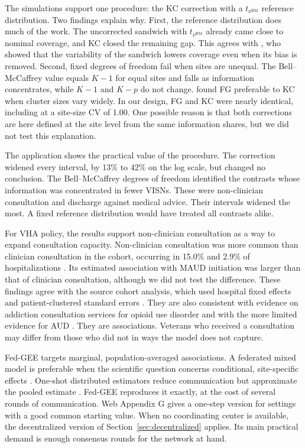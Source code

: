 \documentclass[12pt]{article}
\theoremstyle{remark}
\begin{document}
The simulations support one procedure: the KC correction with a
$t_{\nu^{\mathrm{BM}}}$ reference distribution. Two findings explain why. First,
the reference distribution does much of the work. The uncorrected sandwich with
$t_{\nu^{\mathrm{BM}}}$ already came close to nominal coverage, and KC closed the
remaining gap. This agrees with \citet{kauermann2001note}, who showed that the
variability of the sandwich lowers coverage even when its bias is removed.
Second, fixed degrees of freedom fail when sites are unequal. The
Bell--McCaffrey value equals $K-1$ for equal sites and falls as information
concentrates, while $K-1$ and $K-p$ do not change. \citet{liredden2015sandwich}
found FG preferable to KC when cluster sizes vary widely. In our design, FG and
KC were nearly identical, including at a site-size CV of 1.00. One possible
reason is that both corrections are here defined at the site level from the same
information shares, but we did not test this explanation.

The application shows the practical value of the procedure. The correction
widened every interval, by 13\% to 42\% on the log scale, but changed no
conclusion. The Bell--McCaffrey degrees of freedom identified the contrasts
whose information was concentrated in fewer VISNs. These were non-clinician
consultation and discharge against medical advice. Their intervals widened the
most. A fixed reference distribution would have treated all contrasts alike.

For VHA policy, the results support non-clinician consultation as a way to
expand consultation capacity. Non-clinician consultation was more common than
clinician consultation in the cohort, occurring in 15.0\% and 2.9\% of
hospitalizations \citep{anderson2026initiation}. Its estimated association with MAUD
initiation was larger than that of clinician consultation, although we did not
test the difference. These findings agree with the source cohort analysis, which
used hospital fixed effects and patient-clustered standard errors
\citep{anderson2026initiation}. They are also consistent with evidence on
addiction consultation services for opioid use disorder
\citep{danovitch2024addiction,ober2025hospital} and with the more limited
evidence for AUD \citep{singhtan2023addiction}. They are associations. Veterans who received a consultation may differ from those
who did not in ways the model does not capture.

Fed-GEE targets marginal, population-averaged associations. A federated mixed
model is preferable when the scientific question concerns conditional,
site-specific effects \citep{yan2023privacy}. One-shot distributed estimators
reduce communication but approximate the pooled estimate
\citep{duan2019odal}. Fed-GEE reproduces it exactly, at the cost of several
rounds of communication. Web Appendix G gives a one-step version for settings
with a good common starting value. When no coordinating center is available, the
decentralized version of Section~\ref{sec:decentralized} applies. Its main
practical demand is enough consensus rounds for the network at hand.
\end{document}
